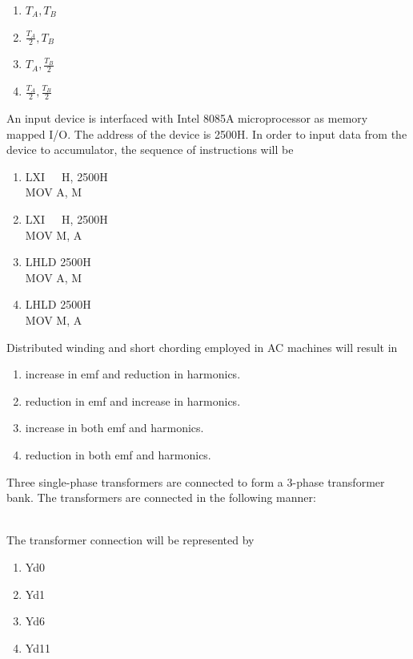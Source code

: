 \begin{enumerate}
     \item $T_A, T_B$
     \item $\frac{T_A}{2}, T_B$
     \item $T_A, \frac{T_B}{2}$
     \item $\frac{T_A}{2}, \frac{T_B}{2}$ \\
 \end{enumerate}
\item An input device is interfaced with Intel 8085A microprocessor as memory mapped I/O. The address of the device is 2500H. In order to input data from the device to accumulator, the sequence of instructions will be
\begin{enumerate}
    \item LXI\ \ \ H, 2500H \\
    MOV A, M
    \item LXI\ \ \ H, 2500H \\
    MOV M, A
    \item LHLD 2500H \\
    MOV A, M
    \item LHLD 2500H \\
    MOV M, A \\
\end{enumerate}
\item Distributed winding and short chording employed in AC machines will result in
\begin{enumerate}
    \item increase in emf and reduction in harmonics.
    \item reduction in emf and increase in harmonics.
    \item increase in both emf and harmonics.
    \item reduction in both emf and harmonics. \\
\end{enumerate}
\item Three single-phase transformers are connected to form a 3-phase transformer bank. The transformers are connected in the following manner:\\
\begin{figure}[!ht]
\centering
\resizebox{0.5\textwidth}{!}{%

}%
\end{figure}\\
The transformer connection will be represented by
\begin{enumerate}
    \item Yd0
    \item Yd1
    \item Yd6
    \item Yd11 \\
\end{enumerate}
